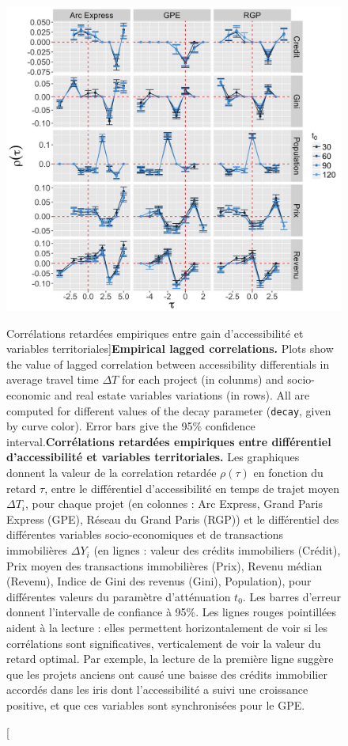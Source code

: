 \begin{figure}%
\includegraphics[width=\linewidth]{Figures/Final/1-2-1-fig-casestudies-empiricalres.jpg}
\caption[Empirical lagged correlations][Corrélations retardées empiriques entre gain d'accessibilité et variables territoriales]{\textbf{Empirical lagged correlations.} Plots show the value of lagged correlation between accessibility differentials in average travel time $\Delta T$ for each project (in colunms) and socio-economic and real estate variables variations (in rows). All are computed for different values of the decay parameter (\texttt{decay}, given by curve color). Error bars give the 95\% confidence interval.\label{fig:empiricalres}}{\textbf{Corrélations retardées empiriques entre différentiel d'accessibilité et variables territoriales.} Les graphiques donnent la valeur de la correlation retardée $\rho(\tau)$ en fonction du retard $\tau$, entre le différentiel d'accessibilité en temps de trajet moyen $\Delta T_i$, pour chaque projet (en colonnes : Arc Express, Grand Paris Express (GPE), Réseau du Grand Paris (RGP)) et le différentiel des différentes variables socio-economiques et de transactions immobilières $\Delta Y_i$ (en lignes : valeur des crédits immobiliers (Crédit), Prix moyen des transactions immobilières (Prix), Revenu médian (Revenu), Indice de Gini des revenus (Gini), Population), pour différentes valeurs du paramètre d'atténuation $t_0$. Les barres d'erreur donnent l'intervalle de confiance à 95\%. Les lignes rouges pointillées aident à la lecture : elles permettent horizontalement de voir si les corrélations sont significatives, verticalement de voir la valeur du retard optimal. Par exemple, la lecture de la première ligne suggère que les projets anciens ont causé une baisse des crédits immobilier accordés dans les iris dont l'accessibilité a suivi une croissance positive, et que ces variables sont synchronisées pour le GPE.\label{fig:casestudies:empiricalres}}
\end{figure}

